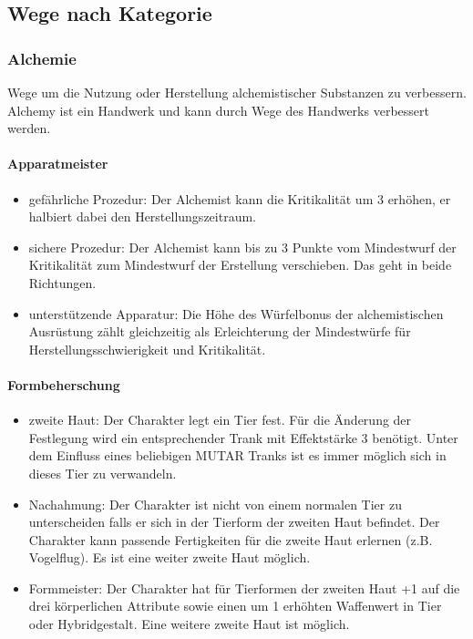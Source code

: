 \documentclass{article}
\begin{document}
\begin{center}
\subsection{Wege nach Kategorie}
\end{center}

\subsubsection{Alchemie}

Wege um die Nutzung oder Herstellung alchemistischer Substanzen zu verbessern. Alchemy ist ein Handwerk und kann
durch Wege des Handwerks verbessert werden.

\paragraph{Apparatmeister}

\begin{itemize}
\item gefährliche Prozedur: Der Alchemist kann die Kritikalität um 3 erhöhen, er halbiert dabei den Herstellungszeitraum.
\item sichere Prozedur: Der Alchemist kann bis zu 3 Punkte vom Mindestwurf der Kritikalität zum Mindestwurf der Erstellung verschieben. Das geht in beide Richtungen.
\item unterstützende Apparatur: Die Höhe des Würfelbonus der alchemistischen Ausrüstung zählt gleichzeitig als Erleichterung der Mindestwürfe für Herstellungsschwierigkeit und Kritikalität.
\end{itemize}

\paragraph{Formbeherschung}

\begin{itemize}
\item zweite Haut: Der Charakter legt ein Tier fest. Für die Änderung der Festlegung wird ein entsprechender Trank mit Effektstärke 3 benötigt. Unter dem Einfluss eines beliebigen MUTAR Tranks ist es immer möglich sich in dieses Tier zu verwandeln.
\item Nachahmung: Der Charakter ist nicht von einem normalen Tier zu unterscheiden falls er sich in der Tierform der zweiten Haut befindet. Der Charakter kann passende Fertigkeiten für die zweite Haut erlernen (z.B. Vogelflug). Es ist eine weiter zweite Haut möglich.
\item Formmeister: Der Charakter hat für Tierformen der zweiten Haut +1 auf die drei körperlichen Attribute sowie einen um 1 erhöhten Waffenwert in Tier oder Hybridgestalt. Eine weitere zweite Haut ist möglich.
\end{itemize}
\end{document}
